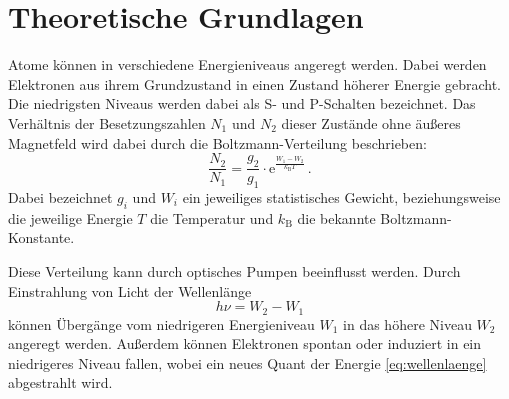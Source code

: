 \section{Theoretische Grundlagen}
\label{sec:theoretische_grundlagen}
Atome können in verschiedene Energieniveaus angeregt werden. Dabei werden
Elektronen aus ihrem Grundzustand in einen Zustand höherer Energie gebracht.
Die niedrigsten Niveaus werden dabei als S- und P-Schalten bezeichnet.  Das
Verhältnis der Besetzungszahlen $N_1$ und $N_2$ dieser Zustände ohne äußeres
Magnetfeld wird dabei durch die Boltzmann-Verteilung beschrieben:
\begin{equation}
\label{eq:boltzmann}
    \frac{N_2}{N_1} = \frac{g_2}{g_1}\cdot
        \mathrm{e}^\frac{W_1 - W_2}{k_\text{B}T}\,.
\end{equation}
Dabei bezeichnet $g_i$ und $W_i$ ein jeweiliges statistisches Gewicht,
beziehungsweise die jeweilige Energie $T$ die Temperatur und $k_\text{B}$ die
bekannte Boltzmann-Konstante.

Diese Verteilung kann durch optisches Pumpen beeinflusst werden.
Durch Einstrahlung von Licht der Wellenlänge
\begin{equation}
\label{eq:wellenlaenge}
    h\nu = W_2 - W_1
\end{equation}
können Übergänge vom niedrigeren Energieniveau $W_1$ in das höhere Niveau
$W_2$ angeregt werden. Außerdem können Elektronen spontan oder induziert in ein
niedrigeres Niveau fallen, wobei ein neues Quant der Energie
\ref{eq:wellenlaenge} abgestrahlt wird.

